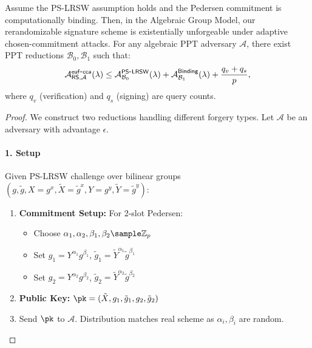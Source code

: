 \begin{theorem}
Assume the PS-LRSW assumption holds and the Pedersen commitment is computationally binding. Then, in the Algebraic Group Model, our rerandomizable signature scheme is existentially unforgeable under adaptive chosen-commitment attacks. For any algebraic PPT adversary $\mathcal{A}$, there exist PPT reductions $\mathcal{B}_0, \mathcal{B}_1$ such that:
\[
\mathcal{A}^{\mathsf{euf\mbox{-}cca}}_{\mathsf{RS},\mathcal{A}}(\lambda) \leq \mathcal{A}^{\mathsf{PS\mbox{-}LRSW}}_{\mathcal{B}_0}(\lambda) + \mathcal{A}^{\mathsf{Binding}}_{\mathcal{B}_1}(\lambda) + \frac{q_v + q_s}{p},
\]
where $q_v$ (verification) and $q_s$ (signing) are query counts.
\end{theorem}

\begin{proof}
We construct two reductions handling different forgery types. Let $\mathcal{A}$ be an adversary with advantage $\epsilon$.

\paragraph{1. Setup}
Given PS-LRSW challenge over bilinear groups $(g, \tilde{g}, X=g^x, \tilde{X}=\tilde{g}^x, Y=g^y, \tilde{Y}=\tilde{g}^y)$:
\begin{enumerate}
    \item \textbf{Commitment Setup:} For 2-slot Pedersen:
    \begin{itemize}
        \item Choose $\alpha_1, \alpha_2, \beta_1, \beta_2 \sample \Z_p$
        \item Set $g_1 = Y^{\alpha_1}g^{\beta_1}$, $\tilde{g}_1 = \tilde{Y}^{\alpha_1}\tilde{g}^{\beta_1}$ 
        \item Set $g_2 = Y^{\alpha_2}g^{\beta_2}$, $\tilde{g}_2 = \tilde{Y}^{\alpha_2}\tilde{g}^{\beta_2}$
    \end{itemize}
    \item \textbf{Public Key:} $\pk = (\tilde{X}, g_1, \tilde{g}_1, g_2, \tilde{g}_2)$
    \item Send $\pk$ to $\mathcal{A}$. Distribution matches real scheme as $\alpha_i, \beta_i$ are random.
\end{enumerate}



\end{proof}
